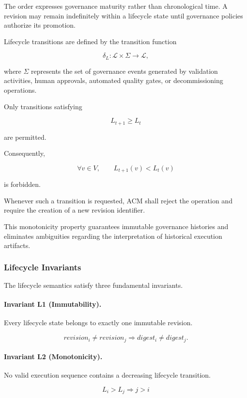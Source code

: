 \documentclass[10pt]{article}
\begin{document}
The order expresses governance maturity rather than chronological time. A
revision may remain indefinitely within a lifecycle state until governance
policies authorize its promotion.

Lifecycle transitions are defined by the transition function

\[
\delta_L:
\mathcal{L}\times\Sigma
\rightarrow
\mathcal{L},
\]

where $\Sigma$ represents the set of governance events generated by validation
activities, human approvals, automated quality gates, or decommissioning
operations.

Only transitions satisfying

\[
L_{t+1}
\geq
L_t
\]

are permitted.

Consequently,

\[
\forall v\in V,
\qquad
L_{t+1}(v)<L_t(v)
\]

is forbidden.

Whenever such a transition is requested, ACM shall reject the operation and
require the creation of a new revision identifier.

This monotonicity property guarantees immutable governance histories and
eliminates ambiguities regarding the interpretation of historical execution
artifacts.

\subsubsection{Lifecycle Invariants}

The lifecycle semantics satisfy three fundamental invariants.

\paragraph{Invariant L1 (Immutability).}

Every lifecycle state belongs to exactly one immutable revision.

\[
revision_i
\neq
revision_j
\Longrightarrow
digest_i
\neq
digest_j.
\]

\paragraph{Invariant L2 (Monotonicity).}

No valid execution sequence contains a decreasing lifecycle transition.

\[
L_i>L_j
\Longrightarrow
j>i
\]
\end{document}
